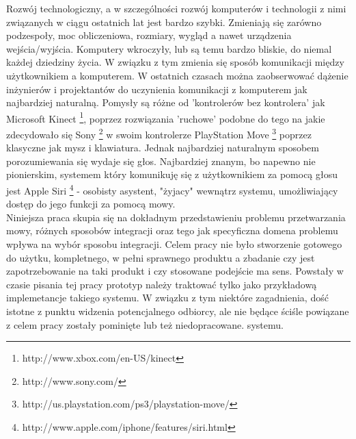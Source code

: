 

\begin{abstracts}        %

Rozwój technologiczny, a w szczególności rozwój komputerów i technologii z nimi związanych w ciągu ostatnich lat jest bardzo szybki. Zmieniają się zarówno podzespoły, moc obliczeniowa, rozmiary, wygląd a nawet urządzenia wejścia/wyjścia. Komputery wkroczyły, lub są temu bardzo bliskie, do niemal każdej dziedziny życia. W związku z tym zmienia się sposób komunikacji między użytkownikiem a komputerem. W ostatnich czasach można zaobserwować dążenie inżynierów i projektantów do uczynienia komunikacji z komputerem jak najbardziej naturalną. Pomysły są różne od 'kontrolerów bez kontrolera' jak Microsoft Kinect \footnote {http://www.xbox.com/en-US/kinect}, poprzez rozwiązania 'ruchowe' podobne do tego na jakie zdecydowało się Sony \footnote{http://www.sony.com/} w swoim kontrolerze PlayStation Move \footnote{http://us.playstation.com/ps3/playstation-move/} poprzez klasyczne  jak mysz i klawiatura. Jednak najbardziej naturalnym sposobem porozumiewania się wydaje się głos. Najbardziej znanym, bo napewno nie pionierskim, systemem który komunikuję się z użytkownikiem za pomocą głosu jest Apple Siri \footnote{http://www.apple.com/iphone/features/siri.html} - osobisty asystent, "żyjacy" wewnątrz systemu, umożliwiający dostęp do jego funkcji za pomocą mowy.\\
Niniejsza praca skupia się na dokładnym przedstawieniu problemu przetwarzania mowy, różnych sposobów integracji oraz tego jak specyficzna domena problemu wpływa na wybór sposobu integracji. Celem pracy nie było stworzenie gotowego do użytku, kompletnego, w pełni sprawnego produktu a zbadanie czy jest zapotrzebowanie na taki produkt i czy stosowane podejście ma sens. Powstały w czasie pisania tej pracy prototyp należy traktować tylko jako przykładową implemetancje takiego systemu. W związku z tym niektóre zagadnienia, dość istotne z punktu widzenia potencjalnego odbiorcy, ale nie będące ściśle powiązane z celem pracy zostały pominięte lub też niedopracowane. 
 systemu.
\end{abstracts}


